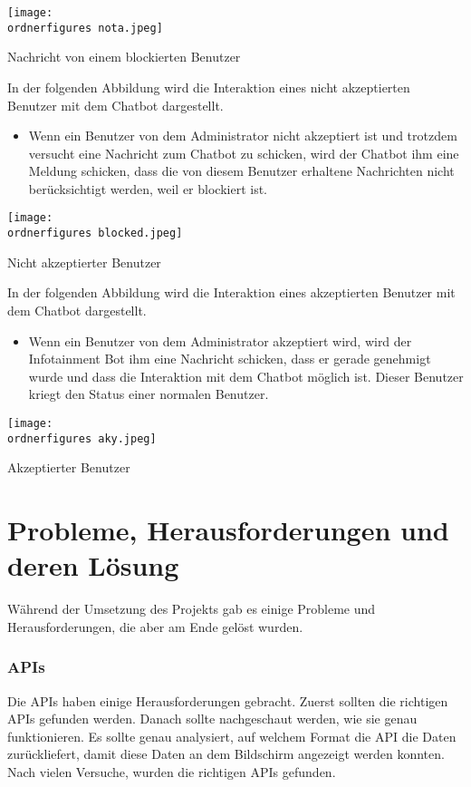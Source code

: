 \begin{center}
	\captionsetup{type=figure}
	\texttt{[image: \\ordnerfigures nota.jpeg]}
	\caption{Nachricht von einem blockierten Benutzer}
	\label{fig:chatbodfsd53}
\end{center}
In der folgenden Abbildung wird die Interaktion eines nicht akzeptierten Benutzer mit dem Chatbot dargestellt.
\begin{itemize}
	\item Wenn ein Benutzer von dem Administrator nicht akzeptiert ist und trotzdem versucht eine Nachricht zum Chatbot zu schicken, wird der Chatbot ihm eine Meldung schicken, dass die von diesem Benutzer erhaltene Nachrichten nicht ber\"ucksichtigt werden, weil er blockiert ist. 
\end{itemize}
\begin{center}
	\captionsetup{type=figure}
	\texttt{[image: \\ordnerfigures blocked.jpeg]}
	\caption{Nicht akzeptierter Benutzer}
	\label{fig:chatb6dfsd53}
\end{center}
In der folgenden Abbildung wird die Interaktion eines akzeptierten Benutzer mit dem Chatbot dargestellt.
\begin{itemize}
	\item Wenn ein Benutzer von dem Administrator akzeptiert wird, wird der Infotainment Bot ihm eine Nachricht schicken, dass er gerade genehmigt wurde und dass die Interaktion mit dem Chatbot m\"oglich ist. Dieser Benutzer kriegt den Status einer normalen Benutzer.
\end{itemize}
\begin{center}
	\captionsetup{type=figure}
	\texttt{[image: \\ordnerfigures aky.jpeg]}
	\caption{Akzeptierter Benutzer }
	\label{fig:chatbodged53}
\end{center}
\section{Probleme, Herausforderungen und deren Lösung}
Während der Umsetzung des Projekts gab es einige Probleme und Herausforderungen, die aber am Ende gelöst wurden.
\subsubsection{APIs}
Die APIs haben einige Herausforderungen gebracht. Zuerst sollten die richtigen APIs gefunden werden. Danach sollte nachgeschaut werden, wie sie genau funktionieren. Es sollte genau analysiert, auf welchem Format die API die Daten zurückliefert, damit diese Daten an dem Bildschirm angezeigt werden konnten. Nach vielen Versuche, wurden die richtigen APIs gefunden.

